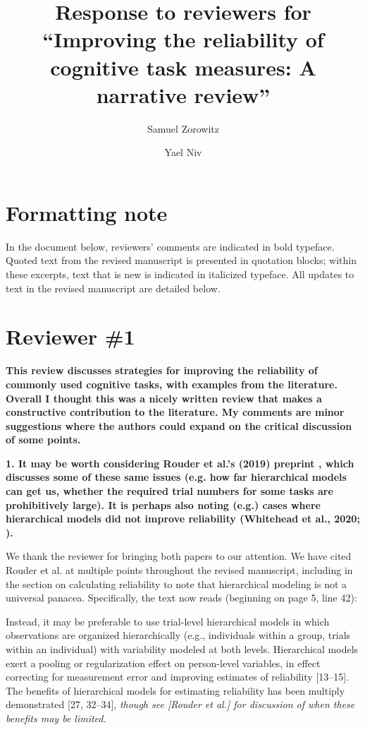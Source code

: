 \documentclass[a4paper,12pt]{article}
\author[1]{Samuel Zorowitz}
\author[1,2]{Yael Niv}
\affil[1]{Princeton Neuroscience Institute, Princeton University, USA}
\affil[2]{Department of Psychology, Princeton University, USA}
\title{Response to reviewers for ``Improving the reliability of cognitive task measures: A narrative review''}
\date{}
\begin{document}
\maketitle

\section*{Formatting note}

In the document below, reviewers' comments are indicated in bold typeface. Quoted text from the revised manuscript is presented in quotation blocks; within these excerpts, text that is new is indicated in italicized typeface. All updates to text in the revised manuscript are detailed below.

\section*{Reviewer \#1}

\textbf{This review discusses strategies for improving the reliability of commonly used cognitive tasks, with examples from the literature. Overall I thought this was a nicely written review that makes a constructive contribution to the literature. My comments are minor suggestions where the authors could expand on the critical discussion of some points.}

\textbf{1. It may be worth considering Rouder et al.'s (2019) preprint \cite{rouder2019most}, which discusses some of these same issues (e.g. how far hierarchical models can get us, whether the required trial numbers for some tasks are prohibitively large). It is perhaps also noting (e.g.) cases where hierarchical models did not improve reliability (Whitehead et al., 2020; \cite{whitehead2020reliability}).}

We thank the reviewer for bringing both papers to our attention. We have cited Rouder et al. at multiple points throughout the revised manuscript, including in the section on calculating reliability to note that hierarchical modeling is not a universal panacea. Specifically, the text now reads (beginning on page 5, line 42):

\begin{displayquote}
     Instead, it may be preferable to use trial-level hierarchical models in which observations are organized hierarchically (e.g., individuals within a group, trials within an individual) with variability modeled at both levels. Hierarchical models exert a pooling or regularization effect on person-level variables, in effect correcting for measurement error and improving estimates of reliability [13–15]. The benefits of hierarchical models for estimating reliability has been multiply demonstrated [27, 32–34], \textit{though see [Rouder et al.] for discussion of when these benefits may be limited.}
\end{displayquote}
\end{document}
